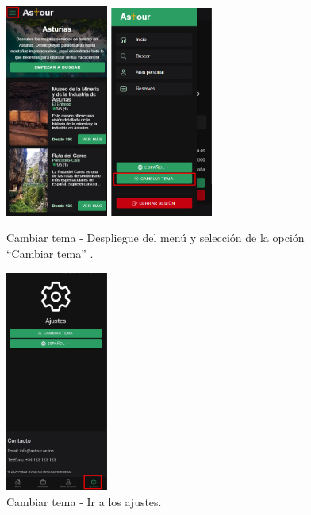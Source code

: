 \begin{figure}[H]
	\centering
	\begin{minipage}{0.45\textwidth}
		\centering
		\includegraphics[width=0.3\textwidth]{7-Construccion/Manuales/mobile/menu marcado.png}
		\includegraphics[width=0.3\textwidth]{7-Construccion/Manuales/mobile/tema marcado.png}
		\caption{Cambiar tema - Despliegue del menú y selección de la opción “Cambiar tema” .}
		\label{fig:tema-movil}
	\end{minipage}
	\hfill
	\begin{minipage}{0.45\textwidth}
		\centering
		\includegraphics[width=0.3\textwidth]{7-Construccion/Manuales/app/P1-Configuration.png}
		\caption{Cambiar tema - Ir a los ajustes.}
		\label{fig:tema-app}
	\end{minipage}
\end{figure}

